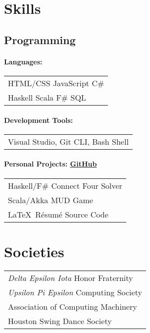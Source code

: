\documentclass[letterpaper]{deedy-resume} %
\begin{document}
\begin{minipage}[t][10cm]{0.26\textwidth}
\section{Skills}

\subsection{Programming}

\paragraph{Languages:}
\begin{tabular}{l}
HTML/CSS \textbullet{} JavaScript \textbullet{} C\#  \\ 
Haskell \textbullet{} Scala \textbullet{} F\# \textbullet{} SQL \\
\end{tabular}
\paragraph{Development Tools:}
\begin{tabular}{l}
Visual Studio, Git CLI, Bash Shell
\end{tabular}

\paragraph{Personal Projects: \href{https://https://github.com/addisonfreeman}{GitHub}}
\begin{tabular}{l}
\textbullet{} Haskell/F\# Connect Four Solver  \\
\textbullet{} Scala/Akka MUD Game \\
\textbullet{} \LaTeX \  Résumé Source Code \\
\end{tabular}

\sectionspace %


\section{Societies} 
\small 
\begin{tabular}{l}
\emph{Delta Epsilon Iota} Honor Fraternity  \\
\emph{Upsilon Pi Epsilon} Computing Society \\
Association of Computing Machinery \\
Houston Swing Dance Society \\
\end{tabular}


\end{minipage}
\end{document}
